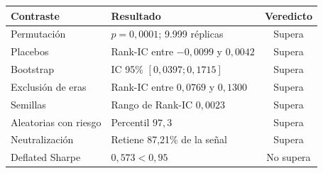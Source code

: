 \begin{tabular}{llc}
\toprule
Contraste & Resultado & Veredicto \\
\midrule
Permutación & $p=0,0001$; 9.999 réplicas & Supera \\
Placebos & Rank-IC entre $-0,0099$ y $0,0042$ & Supera \\
Bootstrap & IC 95\% $[0,0397; 0,1715]$ & Supera \\
Exclusión de eras & Rank-IC entre $0,0769$ y $0,1300$ & Supera \\
Semillas & Rango de Rank-IC $0,0023$ & Supera \\
Aleatorias con riesgo & Percentil $97,3$ & Supera \\
Neutralización & Retiene 87,21\% de la señal & Supera \\
Deflated Sharpe & $0,573 < 0,95$ & No supera \\
\bottomrule
\end{tabular}
